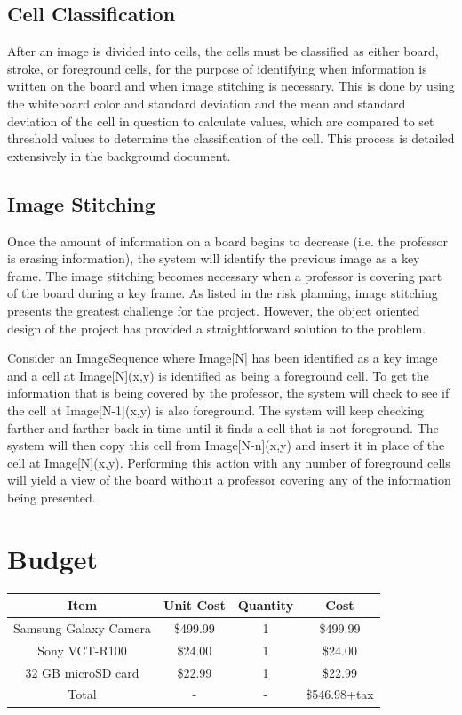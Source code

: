 \documentclass[]{article}
\begin{document}
		\subsection{Cell Classification}
			After an image is divided into cells, the cells must be classified as either board, stroke, or foreground cells, for the purpose of identifying when information is written on the board and when image stitching is necessary.  This is done by using the whiteboard color and standard deviation and the mean and standard deviation of the cell in question to calculate values, which are compared to set threshold values to determine the classification of the cell.  This process is detailed extensively in the background document.
			
		\subsection{Image Stitching}
			Once the amount of information on a board begins to decrease (i.e. the professor is erasing information), the system will identify the previous image as a key frame. The image stitching becomes necessary when a professor is covering part of the board during a key frame. As listed in the risk planning, image stitching presents the greatest challenge for the project. However, the object oriented design of the project has provided a straightforward solution to the problem. 
			
			Consider an ImageSequence where Image[N] has been identified as a key image and a cell at Image[N](x,y) is identified as being a foreground cell. To get the information that is being covered by the professor, the system will check to see if the cell at Image[N-1](x,y) is also foreground. The system will keep checking farther and farther back in time until it finds a cell that is not foreground. The system will then copy this cell from Image[N-n](x,y) and insert it in place of the cell at Image[N](x,y). Performing this action with any number of foreground cells will yield a view of the board without a professor covering any of the information being presented.
	
	\section{Budget}
	
		\begin{tabular}{| c | c | c | c |}
			\hline
			Item					&	Unit Cost		&	Quantity		&	Cost		\\
			\hline
			Samsung Galaxy Camera	&	\$499.99		&	1				&	\$499.99	\\
			\hline
			Sony VCT-R100			&	\$24.00			&	1				&	\$24.00 	\\
			\hline
			32 GB microSD card		&	\$22.99			&	1				&	\$22.99 	\\
			\hline
			Total					&		-			&	-				&	\$546.98+tax\\
			\hline
			
		
		\end{tabular}
	
\end{document}
